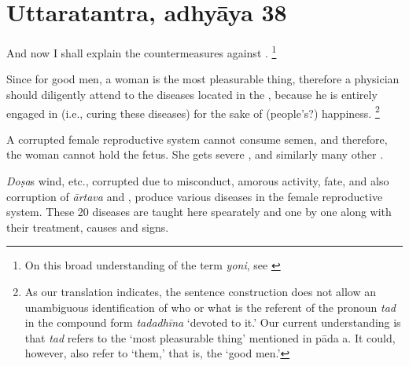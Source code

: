 
\section{Uttaratantra, adhyāya 38}

\begin{translation}

\item [1] And now I shall explain the countermeasures against .%
	\footnote{%
	On this broad understanding of the term \emph{yoni}, see \cite[pp.\ 
	572--5]{das-orig}}

\item [2] Since for good men, a woman is the most pleasurable thing, therefore a physician should diligently attend to the diseases located in the , because he is entirely engaged in (i.e., curing these diseases) for the sake of (people's?) happiness.%
	\footnote{%
	As our translation indicates, the sentence construction does not allow an 
	unambiguous identification of who or what is the referent of the pronoun 
	\textit{tad} in the compound form \emph{tadadhīna} ‘devoted to it.’ Our 
	current understanding is that \emph{tad} refers to the ‘most pleasurable thing’ 
	mentioned in pāda a. It could, however, also refer to ‘them,’ that is, the ‘good 
	men.’%
	}

\item [3] A corrupted female reproductive system cannot consume semen, and 
therefore, the woman cannot hold the fetus. She gets severe 
, 
 and similarly many other 
.

\item [4] \emph{Doṣa}s wind, etc., corrupted due to misconduct, amorous activity, fate, and also corruption of \emph{ārtava} and , produce various diseases in the female reproductive system. These 20 diseases are taught here spearately and one by one along with their treatment, causes and signs.


\end{translation}
